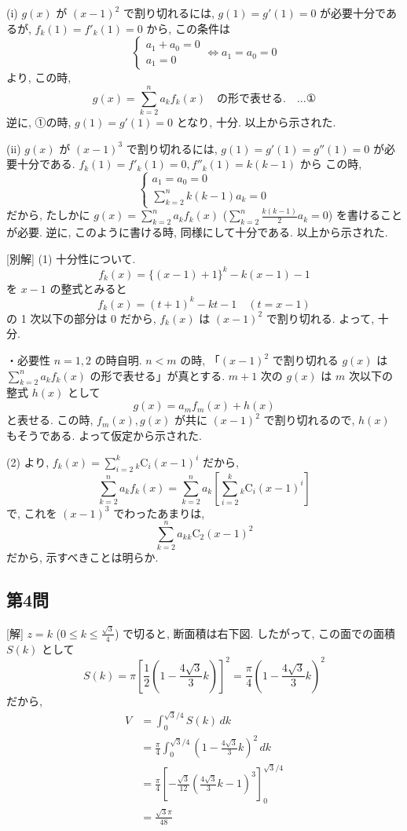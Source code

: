 \documentclass[../main.tex]{subfiles}
\begin{document}
(i) $g(x)$ が $(x-1)^2$ で割り切れるには, $g(1)=g'(1)=0$ が必要十分であるが, $f_k(1)=f'_k(1)=0$ から, この条件は
\[
  \begin{cases} a_1 + a_0 = 0 \\ a_1 = 0
  \end{cases} \iff a_1 = a_0 = 0
\]
より, この時,
\[
  g(x) = \sum_{k=2}^n a_k f_k(x) \quad \text{の形で表せる.} \quad \dots \text{①}
\]
逆に, ①の時, $g(1)=g'(1)=0$ となり, 十分.
以上から示された.

(ii) $g(x)$ が $(x-1)^3$ で割り切れるには, $g(1)=g'(1)=g''(1)=0$ が必要十分である. $f_k(1)=f'_k(1)=0, f''_k(1)=k(k-1)$ から
この時,
\[
  \begin{cases} a_1 = a_0 = 0 \\ \sum_{k=2}^n k(k-1) a_k = 0
  \end{cases}
\]
だから, たしかに $g(x) = \sum_{k=2}^n a_k f_k(x)$ ($\sum_{k=2}^n \frac{k(k-1)}{2} a_k = 0$) を書けることが必要. 逆に, このように書ける時, 同様にして十分である.
以上から示された.

[別解] (1) 十分性について.
\[
  f_k(x) = \{(x-1)+1\}^k - k(x-1) - 1
\]
を $x-1$ の整式とみると
\[
  f_k(x) = (t+1)^k - kt - 1 \quad (t=x-1)
\]
の 1 次以下の部分は $0$ だから, $f_k(x)$ は $(x-1)^2$ で割り切れる. よって, 十分.

・必要性
$n=1,2$ の時自明. $n < m$ の時, 「$(x-1)^2$ で割り切れる $g(x)$ は $\sum_{k=2}^n a_k f_k(x)$ の形で表せる」が真とする. $m+1$ 次の $g(x)$ は $m$ 次以下の整式 $h(x)$ として
\[
  g(x) = a_m f_m(x) + h(x)
\]
と表せる. この時, $f_m(x), g(x)$ が共に $(x-1)^2$ で割り切れるので, $h(x)$ もそうである. よって仮定から示された.

(2) より, $f_k(x) = \sum_{i=2}^k {}_k\mathrm{C}_i (x-1)^i$ だから,
\[
  \sum_{k=2}^n a_k f_k(x) = \sum_{k=2}^n a_k \left[ \sum_{i=2}^k {}_k\mathrm{C}_i (x-1)^i \right]
\]
で, これを $(x-1)^3$ でわったあまりは,
\[
  \sum_{k=2}^n a_k {}_k\mathrm{C}_2 (x-1)^2
\]
だから, 示すべきことは明らか.

\subsection*{第4問}

[解] $z=k$ ($0 \le k \le \frac{\sqrt{3}}{4}$) で切ると, 断面積は右下図. したがって, この面での面積 $S(k)$ として
\[
  S(k) = \pi \left[ \frac{1}{2} \left(1 - \frac{4\sqrt{3}}{3} k\right) \right]^2 = \frac{\pi}{4} \left( 1 - \frac{4\sqrt{3}}{3} k \right)^2
\]
だから,
\begin{align*}
  V &= \int_0^{\sqrt{3}/4} S(k) \, dk \\
  &= \frac{\pi}{4} \int_0^{\sqrt{3}/4} \left( 1 - \frac{4\sqrt{3}}{3} k \right)^2 \, dk \\
  &= \frac{\pi}{4} \left[ -\frac{\sqrt{3}}{12} \left( \frac{4\sqrt{3}}{3} k - 1 \right)^3 \right]_0^{\sqrt{3}/4} \\
  &= \frac{\sqrt{3}\pi}{48}
\end{align*}
\end{document}
